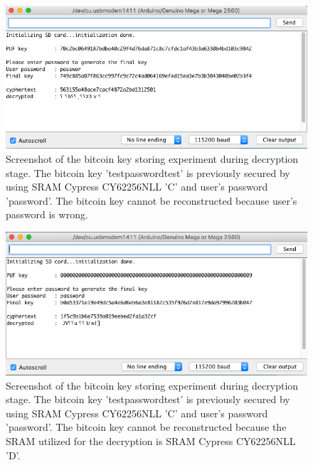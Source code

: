 \begin{figure}[tph!]
    \centerline{\includegraphics[width={\textwidth}]{images/C_decrypt_wrong_password}}
    \caption{Screenshot of the bitcoin key storing experiment during decryption stage. The bitcoin key 'testpasswordtest' is previously secured by using SRAM Cypress CY62256NLL 'C' and user's password 'password'.
    The bitcoin key cannot be reconstructed because user's password is wrong.}
    \label{fig:C_decrypt_wrong_password}
\end{figure}

\begin{figure}[tph!]
    \centerline{\includegraphics[width={\textwidth}]{images/C_decrypt_wrong_SRAM_D}}
    \caption{Screenshot of the bitcoin key storing experiment during decryption stage. The bitcoin key 'testpasswordtest' is previously secured by using SRAM Cypress CY62256NLL 'C' and user's password 'password'.
    The bitcoin key cannot be reconstructed because the SRAM utilized for the decryption is SRAM Cypress CY62256NLL 'D'.}
    \label{fig:C_decrypt_wrong_SRAM}
\end{figure}


